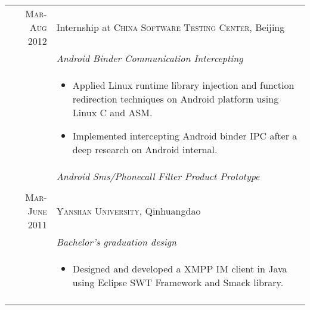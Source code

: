\documentclass[a4paper,10pt]{article} %
\begin{document}
\begin{tabular}{r|p{11cm}}
\textsc{Mar-Aug 2012} & Internship at \textsc{China Software Testing Center}, Beijing \emph{}\smallskip\\
& \emph{Android Binder Communication Intercepting}\\
& \footnotesize{
\begin{itemize}
\item Applied Linux runtime library injection and function redirection techniques on Android platform using Linux C and ASM. 
\item Implemented intercepting Android binder IPC after a deep research on Android internal. 
\end{itemize}
}\\
& \emph{Android Sms/Phonecall Filter Product Prototype}\\
\multicolumn{2}{c}{} \\
\textsc{Mar-June 2011} & \textsc{Yanshan University}, Qinhuangdao \emph{}\smallskip\\
& \emph{Bachelor's graduation design}\\
& \footnotesize{
\begin{itemize}
\item Designed and developed a XMPP IM client in Java using Eclipse SWT Framework and Smack library.
\end{itemize}
 }\smallskip\\
\multicolumn{2}{c}{} \\


\end{tabular}
\end{document}
